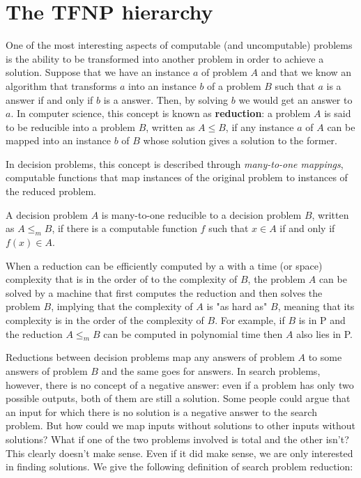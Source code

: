 \newpage

\section{The \textsf{TFNP} hierarchy}

One of the most interesting aspects of computable (and uncomputable) problems is the ability to be transformed into another problem in order to achieve a solution. Suppose that we have an instance $a$ of problem $A$ and that we know an algorithm that transforms $a$ into an instance $b$ of a problem $B$ such that $a$ is a  answer if and only if $b$ is a  answer. Then, by solving $b$ we would get an answer to $a$. In computer science, this concept is known as \textbf{reduction}: a problem $A$ is said to be reducible into a problem $B$, written as $A \leq B$, if any instance $a$ of $A$ can be mapped into an instance $b$ of $B$ whose solution gives a solution to the former.

In decision problems, this concept is described through \textit{many-to-one mappings}, computable functions that map instances of the original problem to instances of the reduced problem.

\begin{definition}
 A decision problem $A$ is many-to-one reducible to a decision problem $B$, written as $A \leq_m B$, if there is a computable function $f$ such that $x \in A$ if and only if $f(x) \in A$. 
\end{definition}

When a reduction can be efficiently computed by a \TM with a time (or space) complexity that is in the order of to the complexity of $B$, the problem $A$ can be solved by a machine that first computes the reduction and then solves the problem $B$, implying that the complexity of $A$ is "as hard as" $B$, meaning that its complexity is in the order of the complexity of $B$. For example, if $B$ is in \textsf{P} and the reduction $A \leq_m B$ can be computed in polynomial time then $A$ also lies in \textsf{P}.

Reductions between decision problems map any  answers of problem $A$ to some  answers of problem $B$ and the same goes for  answers. In search problems, however, there is no concept of a negative answer: even if a problem has only two possible outputs, both of them are still a solution. Some people could argue that an input for which there is no solution is a negative answer to the search problem. But how could we map inputs without solutions to other inputs without solutions? What if one of the two problems involved is total and the other isn't? This clearly doesn't make sense. Even if it did make sense, we are only interested in finding solutions. We give the following definition of search problem reduction:

